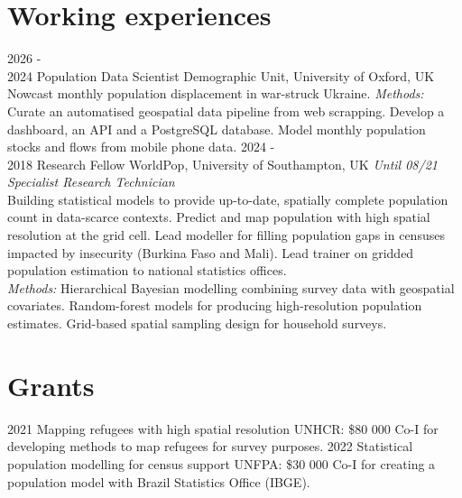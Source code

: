 \documentclass[
]{friggeri-cv}
\begin{document}
\section{Working experiences}
\begin{entrylist}
\entry
{2026 - \\ 2024}
{Population Data Scientist}
{Demographic Unit, University of Oxford, UK}
{Nowcast monthly population displacement in war-struck Ukraine.
\textit{Methods:} Curate an automatised geospatial data pipeline from web scrapping. Develop a dashboard, an API and a PostgreSQL database. Model monthly population stocks and flows from mobile phone data.}
\entry
{2024 - \\ 2018}
{Research Fellow}
{WorldPop, University of Southampton, UK}
{\textit{Until 08/21 Specialist Research Technician}\\
Building statistical models to provide up-to-date, spatially complete population count in data-scarce contexts. Predict and map population with high spatial resolution at the grid cell.   Lead modeller for filling population gaps in censuses impacted by insecurity (Burkina Faso and Mali). Lead trainer on gridded population estimation to national statistics offices. \\
\textit{Methods:} Hierarchical Bayesian modelling combining survey data with geospatial covariates. Random-forest models for producing high-resolution population estimates. Grid-based spatial sampling design for household surveys.
}
\end{entrylist}

\section{Grants}
\begin{entrylist}
\entry
{2021}
{Mapping refugees with high spatial resolution}
{UNHCR: \$80 000}
{Co-I for developing methods to map refugees for survey purposes.}
\entry
{2022}
{Statistical population modelling for census support}
{UNFPA: \$30 000}
{Co-I for creating a population model with Brazil Statistics Office (IBGE).}
\end{entrylist}
\end{document}
